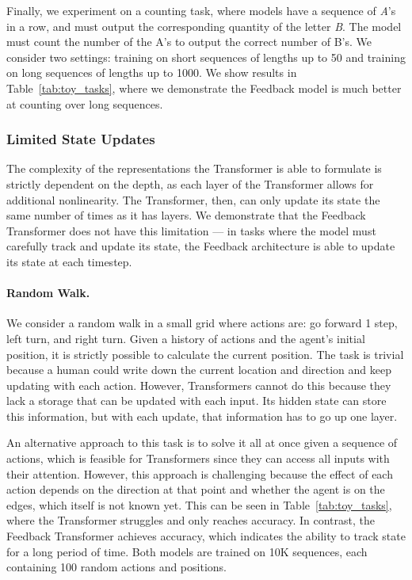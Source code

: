 \documentclass{article} \usepackage{iclr2021_conference}
\newcommand{\tab}[1]{Table~\ref{tab:#1}}
\begin{document}
Finally, we experiment on a counting task, where models have a sequence of \textit{A}'s in a row, and must output the corresponding quantity of the letter \textit{B}. The model must count the number of the A's to output the correct number of B's. We consider two settings: training on short sequences of lengths up to 50 and training on long sequences of lengths up to 1000. We show results in Table~\ref{tab:toy_tasks}, where we demonstrate the Feedback model is much better at counting over long sequences.


\subsubsection{Limited State Updates}

The complexity of the representations the Transformer is able to formulate is strictly dependent on the depth, as each layer of the Transformer allows for additional nonlinearity. The Transformer, then, can only update its state the same number of times as it has layers. We demonstrate that the Feedback Transformer does not have this limitation --- in tasks where the model must carefully track and update its state, the Feedback architecture is able to update its state at each timestep. 

\paragraph{Random Walk.}

We consider a random walk in a small grid where actions are: go forward 1 step, left turn, and right turn. Given a history of actions and the agent's initial position, it is strictly possible to calculate the current position. 
The task is trivial because a human could write down the current location and direction and keep updating with each action. 
However, Transformers cannot do this because they lack a storage that can be updated with each input. Its hidden state can store this information, but with each update, that information has to go up one layer. 

An alternative approach to this task is to solve it all at once given a sequence of actions, which is feasible for Transformers since they can access all inputs with their attention.
However, this approach is challenging because the effect of each action depends on the direction at that point and whether the agent is on the edges, which itself is not known yet.
This can be seen in \tab{toy_tasks}, where the Transformer struggles and only reaches  accuracy. In contrast, the Feedback Transformer achieves  accuracy, which indicates the ability to track state for a long period of time. Both models are trained on 10K sequences, each containing 100 random actions and positions. 
\end{document}
